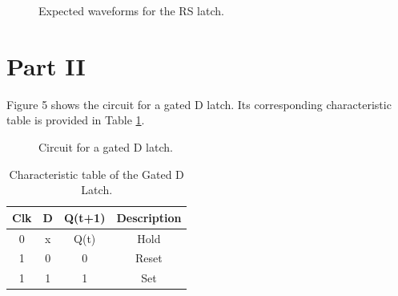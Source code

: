 \documentclass{article}
\begin{document}
\begin{figure}[H]
    \centering
    
    \caption{Expected waveforms for the RS latch.}
    \label{fig:sim_rs_latch}
\end{figure}

\section*{Part II}

Figure 5 shows the circuit for a gated D latch. Its corresponding characteristic table is provided in Table \ref{tab:d_latch_char}.

\begin{figure}[H]
    \centering
    
    \caption{Circuit for a gated D latch.}
    \label{fig:gated_d_latch}
\end{figure}


\begin{table}[H]
    \centering
    \begin{tabular}{|c|c|c|c|}
        \hline
        Clk & D & Q(t+1) & Description \\
        \hline
        0 & x & Q(t) & Hold \\
        1 & 0 & 0 & Reset \\
        1 & 1 & 1 & Set \\
        \hline
    \end{tabular}
    \caption{Characteristic table of the Gated D Latch.}
    \label{tab:d_latch_char}
\end{table}
\end{document}
